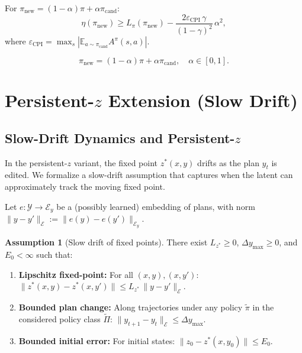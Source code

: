 \documentclass{article}
\theoremstyle{plain}
\theoremstyle{definition}
\newtheorem{assumption}[theorem]{Assumption}
\theoremstyle{remark}
\newcommand{\E}{\mathbb{E}}
\newcommand{\YY}{\mathcal{Y}}
\begin{document}
{%
For $\pi_{\mathrm{new}} = (1-\alpha)\pi + \alpha\pi_{\mathrm{cand}}$:
\begin{equation}
\eta(\pi_{\mathrm{new}}) \ge L_\pi(\pi_{\mathrm{new}}) - \frac{2\varepsilon_{\mathrm{CPI}}\,\gamma}{(1-\gamma)^2}\,\alpha^2,
\label{eq:cpi_bound}
\end{equation}
where $\varepsilon_{\mathrm{CPI}} = \max_s|\E_{a\sim\pi_{\mathrm{cand}}}A^\pi(s,a)|$.

\begin{equation}
\pi_{\mathrm{new}} = (1-\alpha)\pi + \alpha\pi_{\mathrm{cand}}, \quad \alpha\in[0,1].
\label{eq:pi_mixture}
\end{equation}
}

\section{Persistent-$z$ Extension (Slow Drift)}
\label{app:persistent_latent}

\subsection{Slow-Drift Dynamics and Persistent-$z$}
\label{sec:twotimescale_persistent}

In the persistent-$z$ variant, the fixed point $z^*(x,y)$ drifts as the plan $y_t$ is edited.
We formalize a slow-drift assumption that captures when the latent can approximately track the moving fixed point.

Let $e:\YY\to\mathcal{E}_y$ be a (possibly learned) embedding of plans, with norm $\|y-y'\|_{\mathcal{E}} := \|e(y)-e(y')\|_{\mathcal{E}_y}$.

\begin{assumption}[Slow drift of fixed points]
\label{ass:twotimescale}
There exist $L_{z^*} \ge 0$, $\Delta y_{\max} \ge 0$, and $E_0 < \infty$ such that:
\begin{enumerate}
\item \textbf{Lipschitz fixed-point:} For all $(x,y),(x,y')$:
$\bigl\|z^*(x,y) - z^*(x,y')\bigr\| \le L_{z^*}\,\|y-y'\|_{\mathcal{E}}$.
\item \textbf{Bounded plan change:} Along trajectories under any policy $\tilde{\pi}$ in the considered policy class $\tilde{\Pi}$:
$\|y_{t+1}-y_t\|_{\mathcal{E}} \le \Delta y_{\max}$.
\item \textbf{Bounded initial error:} For initial states: $\bigl\|z_0 - z^*(x,y_0)\bigr\|\le E_0$.
\end{enumerate}
\end{assumption}
\end{document}
